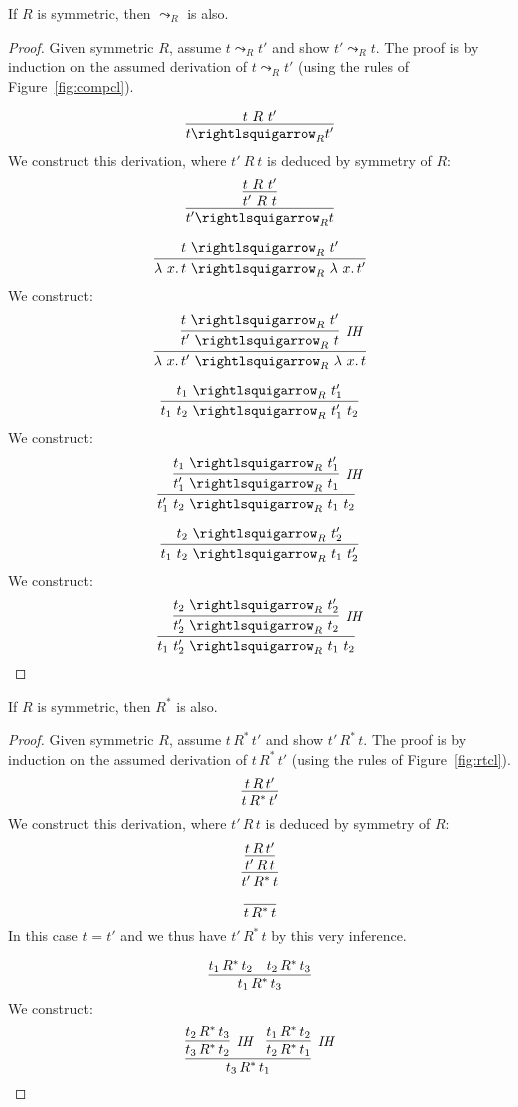 \begin{lemma}
\label{lem:compclsymm}
  If $R$ is symmetric, then $\leadsto_R$ is also.
\end{lemma}
\begin{proof}
  Given symmetric $R$, assume $t \leadsto_R t'$ and show $t' \leadsto_R t$.
  The proof is by induction on the assumed derivation of $t \leadsto_R t'$ (using the rules of Figure~\ref{fig:compcl}).

  \case{ }
  \[
  \infer{t \curva_R t'}{t\ R\ t' }
  \]
  \noindent We construct this derivation, where $t'\ R\ t$ is deduced by symmetry of $R$:
  \[
  \infer{t' \curva_R t}{\infer{t'\ R\ t}{t\ R\ t'}}
  \]

  \case{ }
  \[
  \infer{\lam{x}{t}\ \curva_R\ \lam{x}{t'}}{t\ \curva_R\ t'}
  \]
  \noindent We construct:
  \[
  \infer{\lam{x}{t'}\ \curva_R\ \lam{x}{t}}{\infer[\textit{IH}]{t'\ \curva_R\ t}{t\ \curva_R\ t'}}
  \]

  \case{ }
  \[
  \infer{t_1\ t_2\ \curva_R\ t_1'\ t_2}{t_1\ \curva_R\ t_1'}
  \]
  \noindent We construct:
  \[
  \infer{t_1'\ t_2\ \curva_R\ t_1\ t_2}{\infer[\textit{IH}]{t_1'\ \curva_R\ t_1}{t_1\ \curva_R\ t_1'}}
  \]

  \case{ }
  \[
  \infer{t_1\ t_2\ \curva_R\ t_1\ t_2'}{t_2\ \curva_R\ t_2'}
  \]
  \noindent We construct:
  \[
  \infer{t_1\ t_2'\ \curva_R\ t_1\ t_2}{\infer[\textit{IH}]{t_2'\ \curva_R\ t_2}{t_2\ \curva_R\ t_2'}}
  \]
  
  \end{proof}

\begin{lemma}
\label{lem:rtclsymm}
  If $R$ is symmetric, then $R^*$ is also.
\end{lemma}
\begin{proof}
  Given symmetric $R$, assume $t\,R^*\,t'$ and show $t'\,R^*\,t$.  The proof is by induction
  on the assumed derivation of $t\,R^*\,t'$ (using the rules of Figure~\ref{fig:rtcl}).
  \case{ }
  \[
  \infer{t\,R^*\,t'}{t\,R\,t'}
  \]
  \noindent We construct this derivation, where $t'\,R\,t$ is deduced by symmetry of $R$:
  \[
  \infer{t'\,R^*\,t}{\infer{t'\,R\,t}{t\,R\,t'}}
  \]

  \case{ }
  \[
  \infer{t\,R^*\,t}{\,}
  \]
  \noindent In this case $t = t'$ and we thus have $t'\,R^*\,t$ by this very inference.

  \case{ }
  \[
  \infer{t_1\,R^*\,t_3}{t_1\,R^*\,t_2 & t_2\,R^*\,t_3}
  \]
  \noindent We construct:
  \[
  \infer{t_3\,R^*\,t_1}{\infer[\textit{IH}]{t_3\,R^*\,t_2}{t_2\,R^*\,t_3} & \infer[\textit{IH}]{t_2\,R^*\,t_1}{t_1\,R^*\,t_2}}
  \]
  \end{proof}

